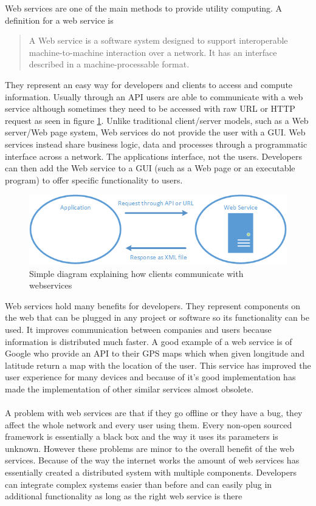  Web services are one of the main methods to provide utility computing. A definition for a web service is  
\begin{quote}A Web service is a software system designed to support interoperable machine-to-machine interaction over a network. 
It has an interface described in a machine-processable format.\cite{webservdef}\end{quote}
They represent an easy way for developers and clients to access and compute information. Usually through an API users are
able to communicate with a web service although sometimes they need to be accessed with raw URL or HTTP request as seen in figure \ref{fig:webserv}.
Unlike traditional client/server models, such as a Web server/Web page system, Web services do not provide the user with a GUI.
Web services instead share business logic, data and processes through a programmatic interface across a network. The applications
interface, not the users. Developers can then add the Web service to a GUI (such as a Web page or an executable program) to offer
specific functionality to users.
\begin{figure}[htp]
\centering
\includegraphics[scale=0.7]{Figures/WebService.png}
\caption{Simple diagram explaining how clients communicate with webservices}
\label{fig:webserv}
\end{figure}
Web services hold many benefits for developers. They represent components on the web that can be plugged in any project
or software so its functionality can be used. It improves communication between companies and users because information
is distributed much faster. A good example of a web service is of Google who provide an API to their GPS maps which when 
given longitude and latitude return a map with the location of the user. This service has improved the user experience
for many devices and because of it's good implementation has made the implementation of other similar services almost
obsolete.
\paragraph{}
A problem with web services are that if they go offline or they have a bug, they affect the whole network and every
user using them. Every non-open sourced framework is essentially a black box and the way it uses its parameters is unknown.
However these problems are minor to the overall benefit of the web services. Because of the way the internet works
the amount of web services has essentially created a distributed system with multiple components. Developers can integrate
complex systems easier than before and can easily plug in additional functionality as long as the right web service is there 

